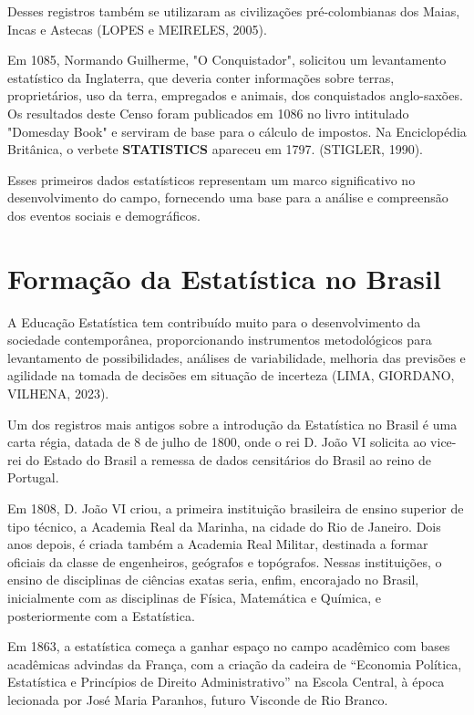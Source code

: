 Desses registros também se utilizaram as civilizações pré-colombianas dos Maias, Incas e Astecas (LOPES e  MEIRELES, 2005).\vskip0.3cm

Em 1085, Normando Guilherme, "O Conquistador", solicitou um levantamento estatístico da Inglaterra, que deveria conter informações sobre terras, proprietários, uso da terra, empregados e animais, dos conquistados anglo-saxões. Os resultados deste Censo foram publicados em 1086 no livro intitulado "Domesday Book" e serviram de base para o cálculo de impostos. Na Enciclopédia Britânica, o verbete \textbf{STATISTICS} apareceu em 1797. (STIGLER, 1990).\vskip0.3cm

Esses primeiros dados estatísticos representam um marco significativo no desenvolvimento do campo, fornecendo uma base para a análise e compreensão dos eventos sociais e demográficos.

\section{Formação da Estatística no Brasil}

A Educação Estatística tem contribuído muito para o desenvolvimento da sociedade contemporânea, proporcionando instrumentos metodológicos para levantamento de possibilidades, análises de variabilidade, melhoria das previsões e agilidade na tomada de decisões em situação de incerteza (LIMA, GIORDANO, VILHENA, 2023).\vskip0.3cm

Um dos registros mais antigos sobre a introdução da Estatística no Brasil é uma carta régia, datada de 8 de julho de 1800, onde o rei D. João VI solicita ao vice-rei do Estado do Brasil a remessa de dados censitários do Brasil ao reino de Portugal.\vskip0.3cm

Em 1808, D. João VI criou, a primeira instituição brasileira de ensino superior de tipo técnico, a Academia Real da Marinha, na cidade do Rio de Janeiro. Dois anos depois, é criada também a Academia Real Militar, destinada a formar oficiais da classe de engenheiros, geógrafos e topógrafos. Nessas instituições, o ensino de disciplinas de ciências exatas seria, enfim, encorajado no Brasil, inicialmente com as disciplinas de Física, Matemática e Química, e posteriormente com a Estatística.

\newpage
Em 1863, a estatística começa a ganhar espaço no campo acadêmico com bases acadêmicas advindas da França, com a criação da cadeira de “Economia Política, Estatística e Princípios de Direito Administrativo” na Escola Central, à época lecionada por José Maria Paranhos, futuro Visconde de Rio Branco.\vskip0.3cm


